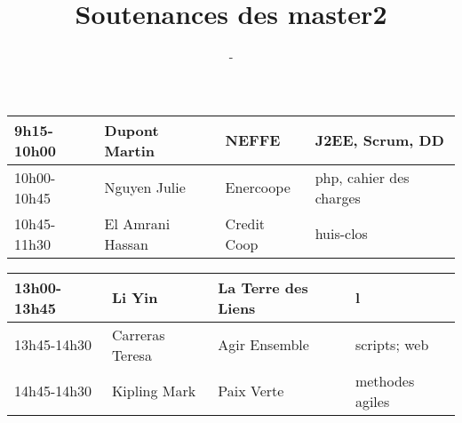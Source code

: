 \documentclass{article}
\title{\huge Soutenances des master2}
\author{\Huge \lemaster}
\date{\huge \ladate - \lasalle}
\begin{document}
\maketitle
\pagestyle{empty}
\Large

\hspace*{-3cm}\begin{tabular}[t]{|l|l|l|l|}\hline
9h15-10h00&Dupont Martin&NEFFE&J2EE, Scrum, DD\\ \hline
10h00-10h45&Nguyen Julie&Enercoope&php, cahier des charges\\ \hline
10h45-11h30&El Amrani Hassan&Credit Coop&huis-clos\\ \hline
\end{tabular}

\bigskip
\hspace*{-3cm}\begin{tabular}[t]{|l|l|l|l|}
\hline
13h00-13h45&Li Yin&La Terre des Liens&l\\ \hline
13h45-14h30&Carreras Teresa&Agir Ensemble&scripts; web\\ \hline
\hline
14h45-14h30&Kipling Mark&Paix Verte&methodes agiles \\ \hline
\end{tabular}
\end{document}
